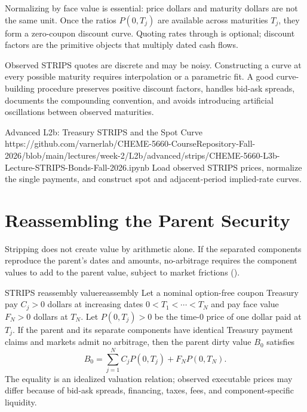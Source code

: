 \documentclass[11pt]{article}
\begin{document}
Normalizing by face value is essential: price dollars and maturity dollars are not the same unit. Once the ratios $P(0,T_j)$ are available across maturities $T_j$, they form a zero-coupon discount curve. Quoting rates through  is optional; discount factors are the primitive objects that multiply dated cash flows.

Observed STRIPS quotes are discrete and may be noisy. Constructing a curve at every possible maturity requires interpolation or a parametric fit. A good curve-building procedure preserves positive discount factors, handles bid-ask spreads, documents the compounding convention, and avoids introducing artificial oscillations between observed maturities.

\notebooklink
  {Advanced L2b: Treasury STRIPS and the Spot Curve}
  {https://github.com/varnerlab/CHEME-5660-CourseRepository-Fall-2026/blob/main/lectures/week-2/L2b/advanced/strips/CHEME-5660-L3b-Lecture-STRIPS-Bonds-Fall-2026.ipynb}
  {Load observed STRIPS prices, normalize the single payments, and construct spot and adjacent-period implied-rate curves.}

\section{Reassembling the Parent Security}

Stripping does not create value by arithmetic alone. If the separated components reproduce the parent's dates and amounts, no-arbitrage requires the component values to add to the parent value, subject to market frictions ().

\begin{proposition}{STRIPS reassembly value}{reassembly}
Let a nominal option-free coupon Treasury pay $C_j>0$ dollars at increasing dates $0<T_1<\cdots<T_N$ and pay face value $F_N>0$ dollars at $T_N$. Let $P(0,T_j)>0$ be the time-0 price of one dollar paid at $T_j$. If the parent and its separate components have identical Treasury payment claims and markets admit no arbitrage, then the parent dirty value $B_0$ satisfies
\begin{equation}
  \label{eq:reassembly}
  B_0=\sum_{j=1}^{N}C_jP(0,T_j)+F_NP(0,T_N).
\end{equation}
The equality is an idealized valuation relation; observed executable prices may differ because of bid-ask spreads, financing, taxes, fees, and component-specific liquidity.
\end{proposition}
\end{document}
